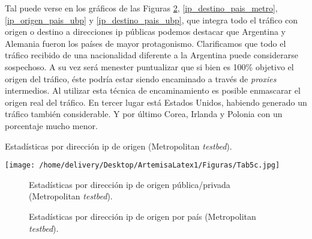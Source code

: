 \documentclass[a4paper,12pt]{report}
\begin{document}
{Tal puede verse en los gráficos de las Figuras \ref{ip_origen_pais_metro}, \ref{ip_destino_pais_metro}, 
\ref{ip_origen_pais_ubp} y \ref{ip_destino_pais_ubp},
que integra todo el tráfico con origen o destino a direcciones \ac{ip} públicas
podemos destacar que Argentina y Alemania fueron los países de mayor
protagonismo. Clarificamos que todo el tráfico recibido de una
nacionalidad diferente a la Argentina puede considerarse sospechoso. A su vez
será menester puntualizar que si bien es 100\% objetivo el origen del tráfico, éste
podría estar siendo encaminado a través de \emph{proxies} intermedios. Al utilizar
esta técnica de encaminamiento es posible enmascarar el origen real del tráfico.
En tercer lugar está Estados Unidos, habiendo generado un tráfico también
considerable. Y por último Corea, Irlanda y Polonia con un porcentaje mucho
menor.

\begin{table}[h!]
\caption{Estadísticas por dirección \ac{ip} de origen (Metropolitan \emph{testbed}).}
\centering
\texttt{[image: /home/delivery/Desktop/ArtemisaLatex1/Figuras/Tab5c.jpg]}
\label{tabla_ip_origen_metro}
\end{table}

\begin{figure}[h!]
 \centering
 \caption{Estadísticas por dirección \ac{ip} de origen pública/privada (Metropolitan
\emph{testbed}).}
\label{ip_origen_pp_metro}
\end{figure}

\begin{figure}[h!]
 \centering
 \caption{Estadísticas por dirección \ac{ip} de origen por país (Metropolitan
\emph{testbed}).}
\label{ip_origen_pais_metro}
\end{figure}

}
\end{document}
